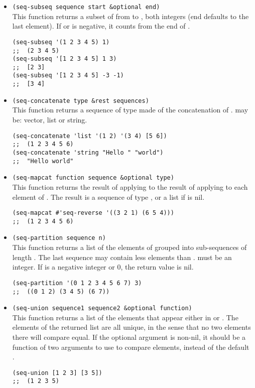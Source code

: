 \begin{itemize}
  
\item \lstinline|(seq-subseq sequence start &optional end)|\\
  This function returns a subset of  from  to , both integers (end defaults to the last element).
  If  or  is negative, it counts from the end of .
\begin{lstlisting}
(seq-subseq '(1 2 3 4 5) 1)
;;  (2 3 4 5)
(seq-subseq '[1 2 3 4 5] 1 3)
;;  [2 3]
(seq-subseq '[1 2 3 4 5] -3 -1)
;;  [3 4]
\end{lstlisting}

\item \lstinline|(seq-concatenate type &rest sequences)|\\
  This function returns a sequence of type  made of the concatenation of .
   may be: vector, list or string.
\begin{lstlisting}
(seq-concatenate 'list '(1 2) '(3 4) [5 6])
;;  (1 2 3 4 5 6)
(seq-concatenate 'string "Hello " "world")
;;  "Hello world"
\end{lstlisting}

  
\item \lstinline|(seq-mapcat function sequence &optional type)|\\
  This function returns the result of applying  to the result of applying  to each element of .
  The result is a sequence of type , or a list if  is nil.
\begin{lstlisting}
(seq-mapcat #'seq-reverse '((3 2 1) (6 5 4)))
;;  (1 2 3 4 5 6)
\end{lstlisting}

  
\item \lstinline|(seq-partition sequence n)|\\
  This function returns a list of the elements of  grouped into sub-sequences of length .
  The last sequence may contain less elements than .
   must be an integer.
  If  is a negative integer or 0, the return value is nil.
\begin{lstlisting}
(seq-partition '(0 1 2 3 4 5 6 7) 3)
;;  ((0 1 2) (3 4 5) (6 7))
\end{lstlisting}

  
\item \lstinline|(seq-union sequence1 sequence2 &optional function)|\\
  This function returns a list of the elements that appear either in  or .
  The elements of the returned list are all unique, in the sense that no two elements there will compare equal.
  If the optional argument  is non-nil, it should be a function of two arguments to use to compare elements, instead of the default .
\begin{lstlisting}
(seq-union [1 2 3] [3 5])
;;  (1 2 3 5)
\end{lstlisting}


\end{itemize}
